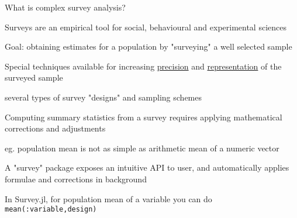 \documentclass[aspectratio=169]{beamer}
\newenvironment{wideitemize}{\itemize\addtolength{\itemsep}{10pt}}{\enditemize}
\begin{document}
\begin{frame}{What is complex survey analysis?}
\begin{wideitemize}
  \item Surveys are an empirical tool for social, behavioural and experimental sciences
  \item Goal: obtaining estimates for a population by "surveying" a well selected sample
  \item Special techniques available for increasing \underline{precision} and \underline{representation} of the surveyed sample
   	\begin{wideitemize}
  		\item several types of survey "designs" and sampling schemes
  	\end{wideitemize} 
  	
  \item Computing summary statistics from a survey requires  applying mathematical corrections and adjustments
  	\begin{wideitemize}
  		\item eg. population mean is not as simple as arithmetic mean of a numeric vector
  	\end{wideitemize}
  \item A "survey" package exposes an intuitive API to user, and automatically applies formulae and corrections in background
   	\begin{wideitemize}
  		\item In Survey.jl, for population mean of a variable you can do \verb $mean(:variable,design)$
  	\end{wideitemize}
\end{wideitemize}
\end{frame}
\end{document}
